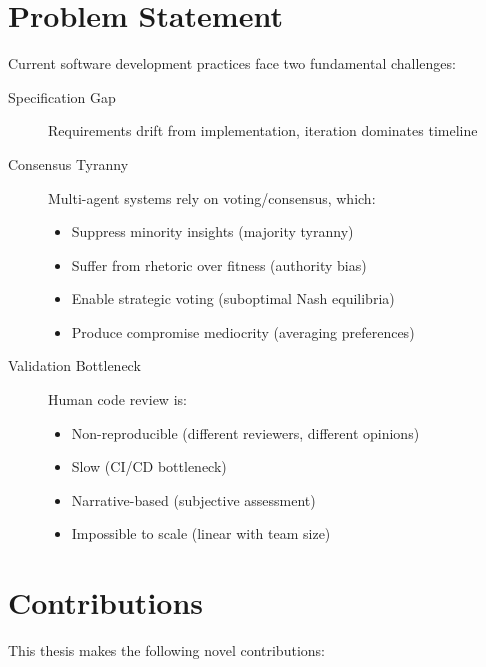 \documentclass[12pt,oneside,a4paper]{book}
\theoremstyle{definition}
\begin{document}
\section{Problem Statement}
\label{sec:intro-problem}

Current software development practices face two fundamental challenges:

\begin{description}
  \item[Specification Gap] Requirements drift from implementation, iteration dominates timeline
  \item[Consensus Tyranny] Multi-agent systems rely on voting/consensus, which:
    \begin{itemize}
      \item Suppress minority insights (majority tyranny)
      \item Suffer from rhetoric over fitness (authority bias)
      \item Enable strategic voting (suboptimal Nash equilibria)
      \item Produce compromise mediocrity (averaging preferences)
    \end{itemize}
  \item[Validation Bottleneck] Human code review is:
    \begin{itemize}
      \item Non-reproducible (different reviewers, different opinions)
      \item Slow (CI/CD bottleneck)
      \item Narrative-based (subjective assessment)
      \item Impossible to scale (linear with team size)
    \end{itemize}
\end{description}

\section{Contributions}
\label{sec:intro-contributions}

This thesis makes the following novel contributions:
\end{document}

